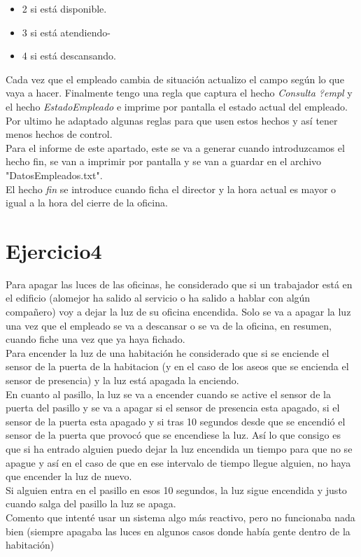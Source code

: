 \documentclass[10pt,spanish]{article}
\begin{document}
\begin{itemize}
\begin{itemize}
			\item 2 si está disponible.
			\item 3 si está atendiendo-
			\item 4 si está descansando.
		\end{itemize}
		Cada vez que el empleado cambia de situación actualizo el campo según lo que vaya a hacer.
		Finalmente tengo una regla que captura el hecho \textit{Consulta ?empl} y el hecho \textit{EstadoEmpleado} e imprime por pantalla el estado actual del empleado. \\
		Por ultimo he adaptado algunas reglas para que usen estos hechos y así tener menos hechos de control.
		\\Para el informe de este apartado, este se va a generar cuando introduzcamos el hecho fin, se van a imprimir por pantalla y se van a guardar en el archivo "DatosEmpleados.txt".
		\\El hecho \textit{fin} se introduce cuando ficha el director y la hora actual es mayor o igual a la hora del cierre de la oficina.
	\end{itemize}
	\section{Ejercicio4}
	Para apagar las luces de las oficinas, he considerado que si un trabajador está en el edificio (alomejor ha salido al servicio o ha salido a hablar con algún compañero) voy a dejar la luz de
	su oficina encendida. Solo se va a apagar la luz una vez que el empleado se va a descansar o se va de la oficina, en resumen, cuando fiche una vez que ya haya fichado.\\
	Para encender la luz de una habitación he considerado que si se enciende el sensor de la puerta de la habitacion (y en el caso de los aseos que se encienda el sensor de presencia) y la luz está apagada
	la enciendo. \\
	En cuanto al pasillo, la luz se va a encender cuando se active el sensor de la puerta del pasillo y se va a apagar si el sensor de presencia esta apagado, si el sensor de la puerta esta apagado y si tras 10 segundos desde que se encendió el sensor de la puerta que provocó que se encendiese la luz.
	Así lo que consigo es que si ha entrado alguien puedo dejar la luz encendida un tiempo para que no se apague y así en el caso de que en ese intervalo de tiempo llegue alguien, no haya que encender la luz de nuevo.\\
	Si alguien entra en el pasillo en esos 10 segundos, la luz sigue encendida y justo cuando salga del pasillo la luz se apaga.\\
	Comento que intenté usar un sistema algo más reactivo, pero no funcionaba nada bien (siempre apagaba las luces en algunos casos donde había gente dentro de la habitación)
\end{document}
